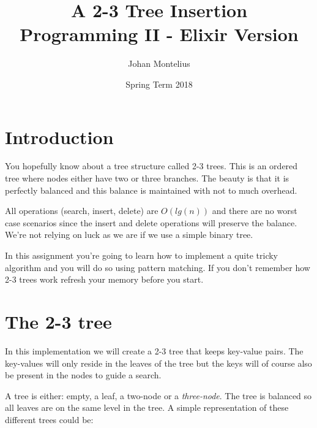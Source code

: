 \documentclass[a4paper,11pt]{article}
\begin{document}

\title{
    \textbf{A 2-3 Tree Insertion}\\
    \large{Programming II - Elixir Version}
}
\author{Johan Montelius}
\date{Spring Term 2018}
\maketitle
\thispagestyle{fancy}



\section*{Introduction}

You hopefully know about a tree structure called 2-3 trees. This is an
ordered tree where nodes either have two or three branches. The beauty
is that it is perfectly balanced and this balance is maintained with
not to much overhead. 

All operations (search, insert, delete) are $O(lg(n))$ and there are
no worst case scenarios since the insert and delete operations will
preserve the balance. We're not relying on luck as we are if we use a
simple binary tree.

In this assignment you're going to learn how to implement a quite
tricky algorithm and you will do so using pattern matching. If you don't
remember how 2-3 trees work refresh your memory before you start.



\section{The 2-3 tree}

In this implementation we will create a 2-3 tree that keeps key-value
pairs. The key-values will only reside in the leaves of the tree but the
keys will of course also be present in the nodes to guide a search.

A tree is either: empty, a leaf, a two-node or a {\em three-node}. The
tree is balanced so all leaves are on the same level in the tree. A
simple representation of these different trees could be:
\end{document}
